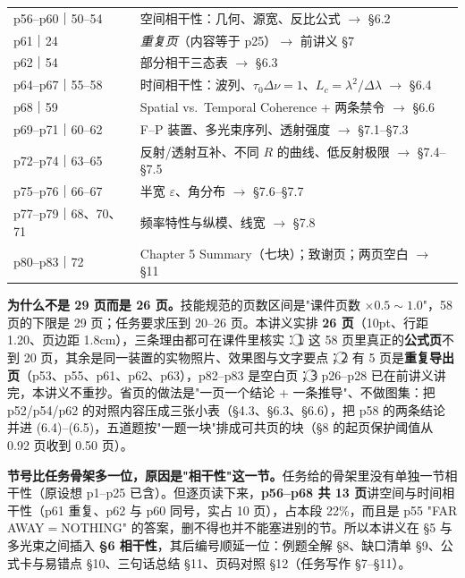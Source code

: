 \documentclass[10pt]{ctexart}
\begin{document}
{\begin{tabular}{@{}>{\raggedright\arraybackslash}m{3.15cm}>{\raggedright\arraybackslash}m{12.6cm}@{}}
p56--p60｜50--54 & 空间相干性：几何、源宽、反比公式 $\to$ \S6.2\\
p61｜24 & \emph{重复页}（内容等于 p25）$\to$ 前讲义 \S7\\
p62｜54 & 部分相干三态表 $\to$ \S6.3\\
p64--p67｜55--58 & 时间相干性：波列、$\tau_0\Delta\nu=1$、$L_c=\lambda^2/\Delta\lambda$ $\to$ \S6.4\\
p68｜59 & Spatial vs.\ Temporal Coherence + 两条禁令 $\to$ \S6.6\\
p69--p71｜60--62 & F--P 装置、多光束序列、透射强度 $\to$ \S7.1--\S7.3\\
p72--p74｜63--65 & 反射/透射互补、不同 $R$ 的曲线、低反射极限 $\to$ \S7.4--\S7.5\\
p75--p76｜66--67 & 半宽 $\varepsilon$、角分布 $\to$ \S7.6--\S7.7\\
p77--p79｜68、70、71 & 频率特性与纵模、线宽 $\to$ \S7.8\\
p80--p83｜72 & Chapter 5 Summary（七块）；致谢页；两页空白 $\to$ \S11\\
\end{tabular}
\tabbot}

\textbf{为什么不是 29 页而是 26 页。}技能规范的页数区间是"课件页数 $\times0.5\sim1.0$"，58 页的下限是 29 页；任务要求压到 20--26 页。本讲义实排 \textbf{26 页}（10pt、行距 1.20、页边距 1.8cm），三条理由都可在课件里核实：\textcircled{1} 这 58 页里真正的\textbf{公式页}不到 20 页，其余是同一装置的实物照片、效果图与文字要点；\textcircled{2} 有 5 页是\textbf{重复导出页}（p53、p55、p61、p62、p63），p82--p83 是空白页；\textcircled{3} p26--p28 已在前讲义讲完，本讲义不重抄。省页的做法是"一页一个结论 + 一条推导"、不做图集：把 p52/p54/p62 的对照内容压成三张小表（\S4.3、\S6.3、\S6.6），把 p58 的两条结论并进 (6.4)--(6.5)，五道题按"一题一块"排成可共页的块（\S8 的起页保护阈值从 0.92 页收到 0.50 页）。

\textbf{节号比任务骨架多一位，原因是"相干性"这一节。}任务给的骨架里没有单独一节相干性（原设想 p1--p25 已含）。但逐页读下来，\textbf{p56--p68 共 13 页}讲空间与时间相干性（p61 重复、p62 与 p60 同号，实占 10 页），占本段 22\%，而且是 p55 "FAR AWAY$=$NOTHING" 的答案，删不得也并不能塞进别的节。所以本讲义在 \S5 与多光束之间插入 \textbf{\S6 相干性}，其后编号顺延一位：例题全解 \S8、缺口清单 \S9、公式卡与易错点 \S10、三句话总结 \S11、页码对照 \S12（任务写作 \S7--\S11）。

\needspace{0.30\textheight}
\end{document}
